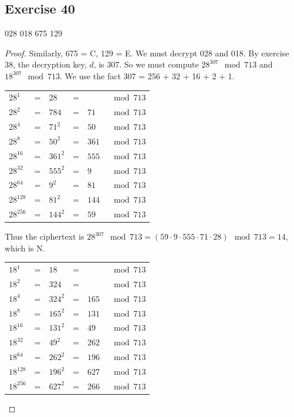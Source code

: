 \documentclass[14pt]{extarticle}
\begin{document}
\subsection{Exercise 40}
028 018 675 129

\begin{proof}
        Similarly, 675 = C, 129 = E. We must decrypt 028 and 018. By exercise 38, the decryption key, $d$, is 307. So we must
        compute \(28^{307} \mod 713\) and \(18^{307} \mod 713\). We use the fact 307 = 256 + 32 + 16 + 2 + 1.

        \begin{tabular}{lclcll}
                \(28^1\)     & = & \(28\)    & = & \(\)    & \(\mod 713\) \\
                \(28^2\)     & = & \(784\)   & = & \(71\)  & \(\mod 713\) \\
                \(28^4\)     & = & \(71^2\)  & = & \(50\)  & \(\mod 713\) \\
                \(28^8\)     & = & \(50^2\)  & = & \(361\) & \(\mod 713\) \\
                \(28^{16}\)  & = & \(361^2\) & = & \(555\) & \(\mod 713\) \\
                \(28^{32}\)  & = & \(555^2\) & = & \(9\)   & \(\mod 713\) \\
                \(28^{64}\)  & = & \(9^2\)   & = & \(81\)  & \(\mod 713\) \\
                \(28^{128}\) & = & \(81^2\)  & = & \(144\) & \(\mod 713\) \\
                \(28^{256}\) & = & \(144^2\) & = & \(59\)  & \(\mod 713\) \\
        \end{tabular}

        Thus the ciphertext is \(28^{307} \mod 713 = (59 \cdot 9 \cdot 555 \cdot 71 \cdot 28) \mod 713 = 14\), which is N.

        \begin{tabular}{lclcll}
                \(18^1\)     & = & \(18\)    & = & \(\)    & \(\mod 713\) \\
                \(18^2\)     & = & \(324\)   & = & \(\)    & \(\mod 713\) \\
                \(18^4\)     & = & \(324^2\) & = & \(165\) & \(\mod 713\) \\
                \(18^8\)     & = & \(165^2\) & = & \(131\) & \(\mod 713\) \\
                \(18^{16}\)  & = & \(131^2\) & = & \(49\)  & \(\mod 713\) \\
                \(18^{32}\)  & = & \(49^2\)  & = & \(262\) & \(\mod 713\) \\
                \(18^{64}\)  & = & \(262^2\) & = & \(196\) & \(\mod 713\) \\
                \(18^{128}\) & = & \(196^2\) & = & \(627\) & \(\mod 713\) \\
                \(18^{256}\) & = & \(627^2\) & = & \(266\) & \(\mod 713\) \\
        \end{tabular}


\end{proof}
\end{document}
